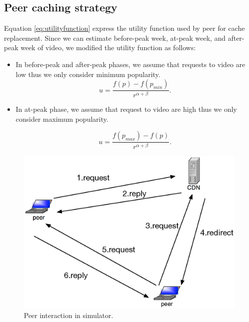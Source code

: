 \documentclass[10pt,final,journal,a4paper]{IEEEtran}
\begin{document}
\subsection{Peer caching strategy}\label{peercachingstrategyproposal}
Equation \ref{eq:utilityfunction} express the utility function used by peer for cache replacement. 
Since we can estimate before-peak week, at-peak week, and after-peak week of video, we modified the utility function as follows: 
\begin{itemize}

\item In before-peak and after-peak phases, we assume that requests to video are low thus we only consider minimum popularity.
\begin{equation}
u = \frac{f(p)-f(p_{min})} {r^{\alpha+\beta}}.
\label{eq:utilityfunctionbeforeafter}
\end{equation}

\item In at-peak phase, we assume that request to video are high thus we only consider maximum popularity.  

\begin{equation}
u = \frac{f(p_{max})-f(p)}{r^{\alpha+\beta}}.
\label{eq:utilityfunctionat}
\end{equation}


\end{itemize}


\begin{figure}[!t]
\begin{center}
\includegraphics[scale=0.5]{graphs/p2p-system-description.eps}
\end{center}
\caption{Peer interaction in simulator.}
\label{fig:p2pcdninteractioninsimulator}
\end{figure} 
\end{document}
